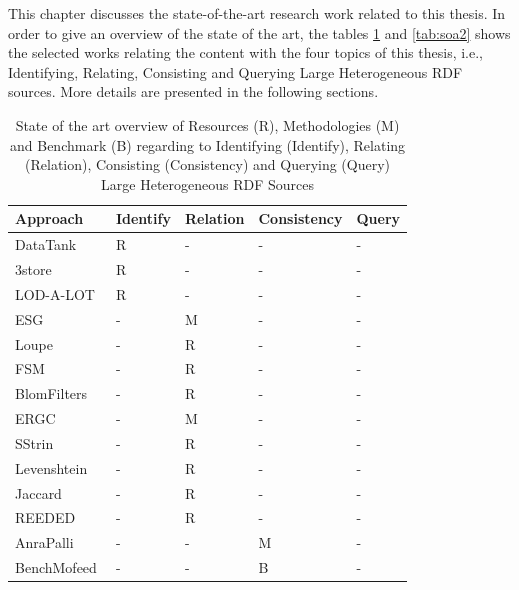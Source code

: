 
This chapter discusses the state-of-the-art research work related to this thesis. In order to give an overview of the state of the art, the tables \ref{tab:soa} and \ref{tab:soa2} shows the selected works relating the content with the four topics of this thesis, i.e., Identifying, Relating, Consisting and Querying Large Heterogeneous RDF sources. More details are presented in the following sections.

\begin{table}[H]
\caption{State of the art overview of Resources (R), Methodologies (M) and Benchmark (B) regarding to Identifying (Identify), Relating (Relation), Consisting (Consistency) and Querying (Query) Large Heterogeneous RDF Sources}
\label{tab:soa}
\begin{center}
\begin{tabular}{@{}lllll@{}}
\toprule
\textbf{Approach} & \textbf{Identify} & \textbf{Relation} & \textbf{Consistency} & \textbf{Query} \\ \midrule
DataTank\cite{colpaert2014painless} & R & - & - & - \\
3store\cite{harris2004semindex} & R & - & - & - \\
LOD-A-LOT~\cite{fernandez2017lod} & R & - & - & - \\
ESG\cite{asprino2019linked} & - & M & - & - \\
Loupe\cite{mihindukulasooriya2016two} & - & R & - & - \\
FSM\cite{emaldi2015detection} & - & R & - & - \\
BlomFilters\cite{baron-2016-ldow-assessing-links} & - & R & - & - \\
ERGC\cite{DBLP:journals/corr/abs-1906-08092} & - & M & - & - \\
SStrin\cite{10.1371/journal.pone.0172526} & - & R & - & - \\
Levenshtein\cite{levenshtein1966binary} & - & R & - & - \\
Jaccard\cite{jaccard1912distribution} & - & R & - & - \\
REEDED\cite{soru2013rapid} & - & R & - & - \\
AnraPalli\cite{anra2013} & - & - & M & - \\
BenchMofeed\cite{mofeed2015} & - & - & B & - \\

\end{tabular}
\end{center}
\end{table}
